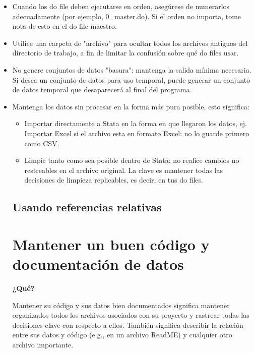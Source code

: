 \documentclass[11pt,en]{elegantpaper}
\begin{document}
	\begin{itemize}
		\item Cuando los do file deben ejecutarse en orden, asegúrese de numerarlos adecuadamente (por ejemplo, 				      0_master.do). Si el orden no importa, tome nota de esto en el do file maestro.
		\item Utilice una carpeta de "archivo" para ocultar todos los archivos antiguos del directorio de trabajo, a fin de 			      limitar la confusión sobre qué do files usar.
		\item No genere conjuntos de datos "basura": mantenga la salida mínima necesaria. Si desea un conjunto de datos para uso 		       temporal, puede generar un conjunto de datos temporal que desaparecerá al final del programa.
		\item Mantenga los datos sin procesar en la forma más pura posible, esto significa:
			\begin{itemize}
			  \item Importar directamente a Stata en la forma en que llegaron los datos, ej. Importar Excel si el archivo 			                esta en formato Excel: no lo guarde primero como CSV.
			  \item Limpie tanto como sea posible dentro de Stata: no realice cambios no restreables en el archivo original.                                 La clave es mantener todas las decisiones de limpieza replicables, es decir, en tus do files.
			\end{itemize}
\subsection{Usando referencias relativas}
\label{sec:refrelativas}

\newpage 
\section{Mantener un buen código y documentación de datos}
\label{sec:documentacion}

\textbf{¿Qué?}

Mantener su código y sus datos bien documentados significa mantener organizados todos los archivos asociados con su proyecto y rastrear todas las decisiones clave con respecto a ellos. También significa describir la relación entre sus datos y código (e.g., en un archivo ReadME) y cualquier otro archivo importante.


\end{itemize}
\end{document}
